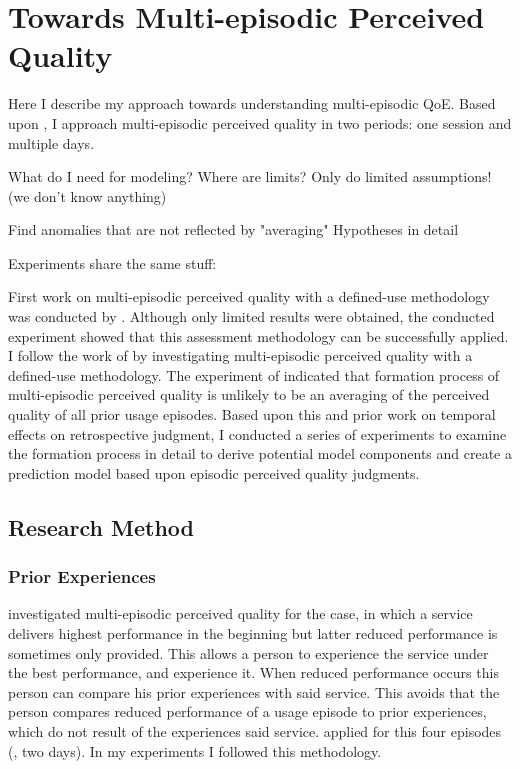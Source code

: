 \chapter{Towards Multi-episodic Perceived Quality}\label{chap:towards}

\begin{chapter-abstract}
Here I describe my approach towards understanding multi-episodic QoE.
Based upon \cite{moller_single-call_2011}, I approach multi-episodic perceived quality in two periods: one session and multiple days.

What do I need for modeling?
Where are limits?
Only do limited assumptions! (we don't know anything)

Find anomalies that are not reflected by "averaging"
Hypotheses in detail

Experiments share the same stuff:
\end{chapter-abstract}

First work on multi-episodic perceived quality with a defined-use methodology was conducted by \cite{moller_single-call_2011}.
Although only limited results were obtained, the conducted experiment showed that this assessment methodology can be successfully applied.
I follow the work of \cite{moller_single-call_2011} by investigating multi-episodic perceived quality with a defined-use methodology.
The experiment of \cite{moller_single-call_2011} indicated that formation process of multi-episodic perceived quality is unlikely to be an averaging of the perceived quality of all prior usage episodes.
Based upon this and prior work on temporal effects on retrospective judgment, I conducted a series of experiments to examine the formation process in detail to derive potential model components and create a prediction model based upon episodic perceived quality judgments.

\section{Research Method}
\subsection{Prior Experiences}
\cite{moller_single-call_2011} investigated multi-episodic perceived quality for the case, in which a service delivers highest performance in the beginning but latter reduced performance is sometimes only provided.
This allows a person to experience the service under the best performance, and experience it.
When reduced performance occurs this person can compare his prior experiences with said service.
This avoids that the person compares reduced performance of a usage episode to prior experiences, which do not result of the experiences said service.
\cite{moller_single-call_2011} applied for this four episodes (\ie, two days).
In my experiments I followed this methodology.

